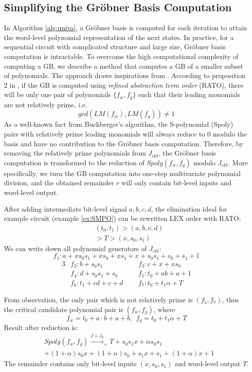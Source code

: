 \subsection{Simplifying the Gr\"obner Basis Computation}
In Algorithm \ref{alg:univa}, a Gr\"obner basis is computed for each
iteration to attain the word-level polynomial representation of the next states. In practice, for 
a sequential circuit with complicated structure and large size, Gr\"obner basis computation
is intractable. To overcome the high computational complexity of computing a GB, 
we describe a method that computes a GB of a smaller subset of polynomials.
The approach draws inspirations from \cite{pruss:tcad}. 
According to proposition 2 in \cite{pruss:tcad}, if the GB is computed using {\it refined abstraction term
order} (RATO), there will be only one pair of polynomials $\{f_w,f_g\}$ such that 
their leading monomials are not relatively prime, i.e. 
$$gcd(LM(f_w), LM(f_g)) \neq 1$$
As a well-known fact from Buchberger's algorithm, the S-polynomial 
(Spoly) pairs with relatively prime 
leading monomials will always reduce to 0 modulo the basis and have no contribution to 
the Gr\"obner basis computation.
Therefore, by removing the relatively prime polynomials from $J_{ckt}$, 
the Gr\"obner basis computation is transformed to the reduction of 
$Spoly(f_w,f_g)$ modulo $J_{ckt}$. More specifically, we turn the
GB computation into one-step multivariate polynomial division, and the obtained
remainder $r$ will only contain bit-level inputs and word-level output. 

\begin{Example}
After adding intermediate bit-level signal $a,b,c,d$, the elimination ideal for example circuit 
(example \ref{ex:SMPO}) can be rewritten LEX order with RATO:
\begin{align}
&(t_0,t_1)>(a,b,c,d)\nonumber\\&>T>(x,s_0,s_1)\nonumber
\end{align}
We can write down all polynomial generators of $J_{ckt}$:
\begin{equation*}
f_1: a+xs_0s_1+xs_0+xs_1+x+s_0s_1+s_0+s_1+1
\end{equation*}
\vspace{-0.8cm}
\begin{alignat*}{3}
& f_2: b+s_0s_1 &&~~~ f_3: c+x+xs_0 \\
& f_4: d+s_0s_1+s_0 &&~~~ f_5: t_0+ab+a+1 \\
& f_6: t_1+cd+c+d &&~~~ f_7: t_0+t_1\alpha+T 
\end{alignat*}

From observation, the only pair which is not relatively prime is
$(f_5,f_7)$, thus the critical candidate polynomial pair is
$(f_w,f_g)$, where $$f_w = t_0+a\cdot b+a+b, ~~f_g =t_0+t_1\alpha + T$$
Result after reduction is:
\begin{align}
&Spoly(f_w,f_g) \xrightarrow{J+J_0}_{+}T + s_0 s_1 x+\alpha s_0 s_1 \nonumber\\
&+(1+\alpha)s_0 x+(1+\alpha) s_0+s_1 x+s_1+(1+\alpha) x+1\nonumber
\end{align}
The remainder contains only bit-level inputs $(x,s_0,s_1)$ and word-level output $T$.
\end{Example}


